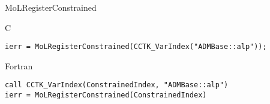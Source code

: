\begin{FunctionDescription}{MoLRegisterConstrained}
  \begin{ExampleSection}
    \begin{Example}{C}
\begin{verbatim}
ierr = MoLRegisterConstrained(CCTK_VarIndex("ADMBase::alp"));
\end{verbatim}
    \end{Example}
    \begin{Example}{Fortran}
\begin{verbatim}
call CCTK_VarIndex(ConstrainedIndex, "ADMBase::alp")
ierr = MoLRegisterConstrained(ConstrainedIndex)
\end{verbatim}
    \end{Example}
  \end{ExampleSection}

\end{FunctionDescription}




